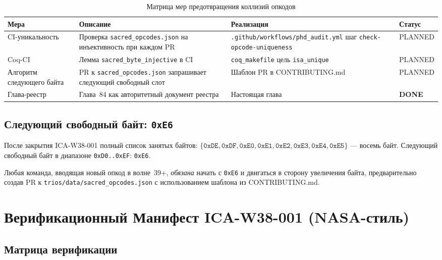 \begin{table}[ht]
\centering
\caption{Матрица мер предотвращения коллизий опкодов}
\label{tab:prevention_matrix}
\begin{tabular}{p{3cm}p{4cm}p{4.5cm}p{1.5cm}}
\hline
Мера & Описание & Реализация & Статус \\
\hline
CI-уникальность & Проверка \texttt{sacred\_opcodes.json}
  на инъективность при каждом PR &
  \texttt{.github/workflows/phd\_audit.yml} шаг
  \texttt{check-opcode-uniqueness} & PLANNED \\
Coq-CI & Лемма \texttt{sacred\_byte\_injective} в CI &
  \texttt{coq\_makefile} цель \texttt{isa\_unique} & PLANNED \\
Алгоритм следующего байта & PR к \texttt{sacred\_opcodes.json}
  запрашивает следующий свободный слот &
  Шаблон PR в CONTRIBUTING.md & PLANNED \\
Глава-реестр & Глава~84 как авторитетный документ реестра &
  Настоящая глава & \textbf{DONE} \\
\hline
\end{tabular}
\end{table}

\subsection{Следующий свободный байт: \texttt{0xE6}}

После закрытия ICA-W38-001 полный список занятых байтов:
$\{\mathtt{0xDE, 0xDF, 0xE0, 0xE1, 0xE2, 0xE3, 0xE4, 0xE5}\}$ — восемь байт.
Следующий свободный байт в диапазоне \texttt{0xD0..0xEF}: \texttt{0xE6}.

Любая команда, вводящая новый опкод в волне~39+, \emph{обязана}
начать с \texttt{0xE6} и двигаться в сторону увеличения байта,
предварительно создав PR к \texttt{trios/data/sacred\_opcodes.json}
с использованием шаблона из CONTRIBUTING.md.

\section{Верификационный Манифест ICA-W38-001 (NASA-стиль)}
\label{app:nasa_manifest}

\subsection{Матрица верификации}

